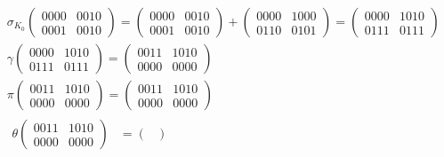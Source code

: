 \documentclass[fleqn]{article}
\begin{document}
    \begin{equation*}
        \begin{aligned}
            &\sigma_{K_0}
            \begin{pmatrix}
                0000 & 0010 \\
                0001 & 0010
            \end{pmatrix} = 
            \begin{pmatrix}
                0000 & 0010 \\
                0001 & 0010
            \end{pmatrix} + 
            \begin{pmatrix}
                0000 & 1000 \\
                0110 & 0101
            \end{pmatrix} = 
            \begin{pmatrix}
                0000 & 1010 \\
                0111 & 0111
            \end{pmatrix} \\
            &\gamma \begin{pmatrix}
                0000 & 1010 \\
                0111 & 0111
            \end{pmatrix} =
            \begin{pmatrix}
                0011 & 1010 \\
                0000 & 0000
            \end{pmatrix} \\
            &\pi \begin{pmatrix}
                0011 & 1010 \\
                0000 & 0000
            \end{pmatrix} =
            \begin{pmatrix}
                0011 & 1010 \\
                0000 & 0000
            \end{pmatrix} \\
            &\begin{aligned} 
                \theta 
                \begin{pmatrix}
                    0011 & 1010 \\
                    0000 & 0000
                \end{pmatrix} &=
                \begin{pmatrix}

\end{pmatrix}
\end{aligned}
\end{aligned}
\end{equation*}
\end{document}
